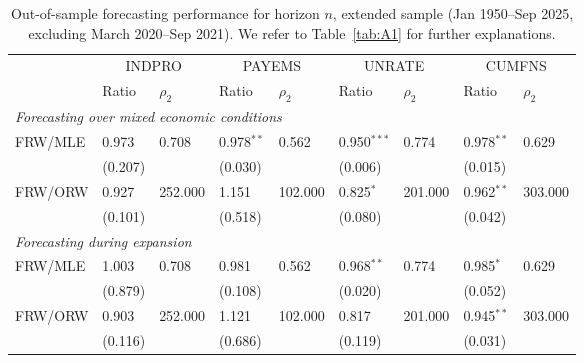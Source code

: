 \begin{table}[h]
\begin{subtable}{\textwidth}
\centering
\small
\begin{tabular}{lllllllll}
\toprule
 & \multicolumn{2}{c}{INDPRO} & \multicolumn{2}{c}{PAYEMS} & \multicolumn{2}{c}{UNRATE} & \multicolumn{2}{c}{CUMFNS} \\
 & Ratio & $\rho_2$ & Ratio & $\rho_2$ & Ratio & $\rho_2$ & Ratio & $\rho_2$ \\
\midrule
\multicolumn{9}{l}{\textit{Forecasting over mixed economic conditions}}\\\midrule
FRW/MLE & 0.973 & 0.708 & 0.978$^{**}$ & 0.562 & 0.950$^{***}$ & 0.774 & 0.978$^{**}$ & 0.629 \\
 & (0.207) &  & (0.030) &  & (0.006) &  & (0.015) &  \\[1ex]
FRW/ORW & 0.927 & 252.000 & 1.151 & 102.000 & 0.825$^{*}$ & 201.000 & 0.962$^{**}$ & 303.000 \\
 & (0.101) &  & (0.518) &  & (0.080) &  & (0.042) &  \\[1ex]
\midrule
\multicolumn{9}{l}{\textit{Forecasting during expansion}}\\\midrule
FRW/MLE & 1.003 & 0.708 & 0.981 & 0.562 & 0.968$^{**}$ & 0.774 & 0.985$^{*}$ & 0.629 \\
 & (0.879) &  & (0.108) &  & (0.020) &  & (0.052) &  \\[1ex]
FRW/ORW & 0.903 & 252.000 & 1.121 & 102.000 & 0.817 & 201.000 & 0.945$^{**}$ & 303.000 \\
 & (0.116) &  & (0.686) &  & (0.119) &  & (0.031) &  \\[1ex]
\bottomrule
\end{tabular}
\caption{$n=3$}
\label{tab:ext2}
\end{subtable}
\caption{Out-of-sample forecasting performance for horizon $n$, extended sample (Jan 1950--Sep 2025, excluding March 2020--Sep 2021). \small We refer to Table~\ref{tab:A1} for further explanations. }
\label{tab:extended}
\end{table}